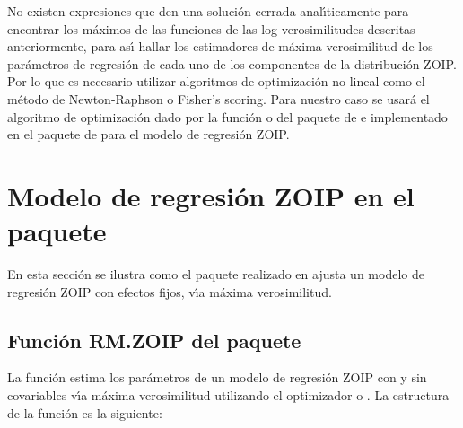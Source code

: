 No existen expresiones que den una soluci\'{o}n cerrada anal\'{\i}ticamente para encontrar los m\'{a}ximos de las funciones de las log-verosimilitudes descritas anteriormente, para as\'{\i} hallar los estimadores de m\'{a}xima verosimilitud de los par\'{a}metros de regresi\'{o}n de cada uno de los componentes de la distribuci\'{o}n ZOIP. Por lo que es necesario utilizar algoritmos de optimizaci\'{o}n no lineal como el m\'{e}todo de Newton-Raphson o Fisher's scoring. Para nuestro caso se usar\'{a} el algoritmo de optimizaci\'{o}n dado por la funci\'{o}n  o  del paquete  de  e implementado en el paquete  de  para el modelo de regresi\'{o}n ZOIP.


\section{Modelo de regresi\'{o}n ZOIP en el paquete }

En esta secci\'{o}n se ilustra como el paquete  realizado en  ajusta un modelo de regresi\'{o}n ZOIP con efectos fijos, v\'{\i}a m\'{a}xima verosimilitud.

%
%

\subsection{Funci\'{o}n RM.ZOIP del paquete }

La funci\'{o}n  estima los par\'{a}metros de un modelo de regresi\'{o}n ZOIP con y sin covariables v\'{\i}a m\'{a}xima verosimilitud utilizando el optimizador  o . La estructura de la funci\'{o}n  es la siguiente:

